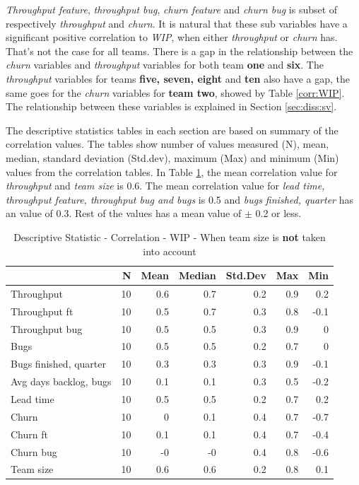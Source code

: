 \documentclass[UKenglish]{ifimaster}  %
\begin{document}
\textit{Throughput feature}, \textit{throughput bug}, \textit{churn feature} and \textit{churn bug} is subset of 
respectively \textit{throughput} and \textit{churn}. It is natural that these sub variables have a significant positive correlation to \textit{WIP}, when either \textit{throughput}  or  \textit{churn} has. That's not the case for all teams. 
There is a gap in the relationship between the \textit{churn} variables and \textit{throughput} variables for both team \textbf{one} and \textbf{six}. The \textit{throughput} variables for teams \textbf{five, seven, eight} and \textbf{ten} also have a gap, the same goes for the \textit{churn} variables for \textbf{team two},  showed by Table \ref{corr:WIP}.  The relationship between these variables is explained in Section \ref{sec:diss:sv}.


The descriptive statistics tables in each section are based on summary of the correlation values. The tables show number of values measured (N), mean, median, standard deviation (Std.dev), maximum (Max)  and minimum (Min) values from the correlation tables.
In Table \ref{DS:corr:WIP}, the mean correlation value for \textit{throughput} and \textit{team size} is 0.6. The mean correlation value for \textit{lead time, throughput feature, throughput bug and bugs} is 0.5 and \textit{bugs finished, quarter} has an value of 0.3. Rest of the values has a mean value of $\pm$ 0.2 or less.
\begin{minipage}[t]{\linewidth}
\begin{table}[H]
 \centering
 \begin{tabular}{ | l | r | r | r | r | r | r | }
 \hline
& \bf{N} & \bf{Mean} & \bf{Median} & \bf{Std.Dev} & \bf{Max} & \bf{Min} \\ \hline
Throughput  & 10 & 0.6 & 0.7 & 0.2 & 0.9 & 0.2\\ \hline
Throughput ft  & 10 & 0.5 & 0.7 & 0.3 & 0.8 & -0.1\\ \hline
Throughput bug  & 10 & 0.5 & 0.5 & 0.3 & 0.9 & 0\\ \hline
Bugs  & 10 & 0.5 & 0.5 & 0.2 & 0.7 & 0\\ \hline
Bugs finished, quarter  & 10 & 0.3 & 0.3 & 0.3 & 0.9 & -0.1\\ \hline
Avg days backlog, bugs  & 10 & 0.1 & 0.1 & 0.3 & 0.5 & -0.2\\ \hline
Lead time & 10 & 0.5 & 0.5 & 0.2 & 0.7 & 0.2\\ \hline
Churn  & 10 & 0 & 0.1 & 0.4 & 0.7 & -0.7\\ \hline
Churn ft  & 10 & 0.1 & 0.1 & 0.4 & 0.7 & -0.4\\ \hline
Churn bug  & 10 & -0 & -0 & 0.4 & 0.8 & -0.6\\ \hline
Team size  & 10 & 0.6 & 0.6 & 0.2 & 0.8 & 0.1\\ \hline
\end{tabular}
 \caption{Descriptive Statistic - Correlation - WIP - When team size is \textbf{not} taken into account}
 \label{DS:corr:WIP}
 \end{table}
\end{minipage} 
\end{document}
